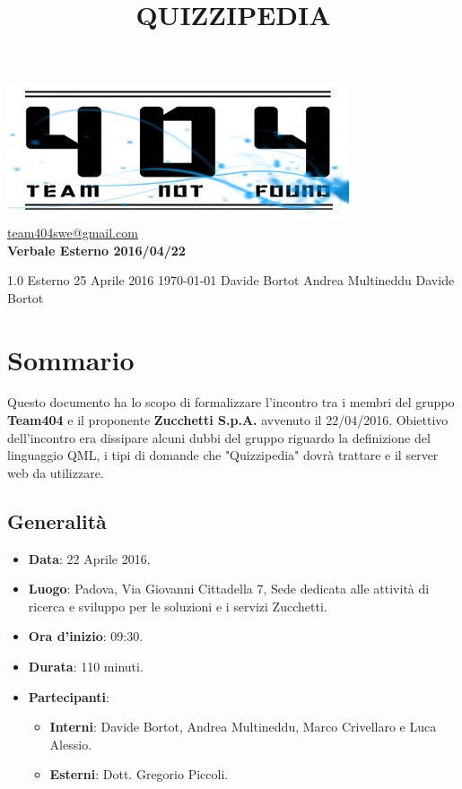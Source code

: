 \documentclass[a4paper,11pt]{article}
\title{\textbf{{\fontsize{10mm}{6mm}\selectfont QUIZZIPEDIA}}}
\begin{document}
	\maketitle
	
	\begin{center}

	\includegraphics{../../team_not_found.jpg}\\	
	\fontsize{5mm}{3mm}\url{team404swe@gmail.com}\\
	\vspace{40mm}
	\textbf{ Verbale Esterno 2016/04/22 }
	\end{center}
	\thispagestyle{empty}	%
			{1.0} 							%
			{Esterno} 						%
			{25 Aprile 2016} 				%
			{\today} 						%
			{Davide Bortot}					%
			{Andrea Multineddu} 			%
			{Davide Bortot} 				%
	
	\newpage
	\section{Sommario}
	Questo documento ha lo scopo di formalizzare l'incontro tra i membri del gruppo \textbf{Team404} e il proponente \textbf{Zucchetti S.p.A.} avvenuto il 22/04/2016. Obiettivo dell'incontro era dissipare alcuni dubbi del gruppo riguardo la definizione del linguaggio QML, i tipi di domande che "Quizzipedia" dovrà trattare e il server web da utilizzare.
	\subsection{Generalità}
	\begin{itemize}
	\item\textbf{Data}: 22 Aprile 2016.
	\item\textbf{Luogo}: Padova, Via Giovanni Cittadella 7, Sede dedicata alle attività di ricerca e sviluppo per le soluzioni e i servizi Zucchetti.
	\item\textbf{Ora d'inizio}: 09:30.
	\item\textbf{Durata}: 110 minuti.
	\item\textbf{Partecipanti}:
	\begin{itemize}
		\item\textbf{Interni}: Davide Bortot, Andrea Multineddu, Marco Crivellaro e Luca Alessio.
		\item\textbf{Esterni}: Dott. Gregorio Piccoli.
	\end{itemize}
	\end{itemize}
\end{document}
